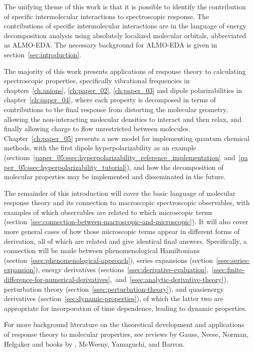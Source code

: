 \documentclass[%
class = book,%
crop = false,%
float = true,%
multi = true,%
preview = false,%
]{standalone}
\begin{document}
The unifying theme of this work is that it is possible to identify the contribution of specific intermolecular interactions to spectroscopic response. The contributions of specific intermolecular interactions are in the language of energy decomposition analysis using absolutely localized molecular orbitals, abbreviated as ALMO-EDA. The necessary background for ALMO-EDA is given in section~\ref{sec:introduction}.

The majority of this work presents applications of response theory to calculating spectroscopic properties, specifically vibrational frequencies in chapters~\ref{ch:anions}, \ref{ch:paper_02}, \ref{ch:paper_03} and dipole polarizabilities in chapter~\ref{ch:paper_04}, where each property is decomposed in terms of contributions to the final response from distorting the molecular geometry, allowing the non-interacting molecular densities to interact and then relax, and finally allowing charge to flow unrestricted between molecules. Chapter~\ref{ch:paper_05} presents a new model for implementing quantum chemical methods, with the first dipole hyperpolarizability as an example (sections~\ref{paper_05:ssec:hyperpolarizability_reference_implementation}~and~\ref{paper_05:ssec:hyperpolarizability_tutorial}), and how the decomposition of molecular properties may be implemented and disseminated in the future.

The remainder of this introduction will cover the basic language of molecular response theory and its connection to macroscopic spectroscopic observables, with examples of which observables are related to which microscopic terms (section~\ref{sec:connection-between-macroscopic-and-microscopic}). It will also cover more general cases of how those microscopic terms appear in different forms of derivation, all of which are related and give identical final answers. Specifically, a connection will be made between phenomenological Hamiltonians (section~\ref{ssec:phenomenological-approach}), series expansions (section~\ref{ssec:series-expansion}), energy derivatives (sections~\ref{ssec:derivative-evaluation},~\ref{ssec:finite-difference-for-numerical-derivatives},~and~\ref{ssec:analytic-derivative-theory}), perturbation theory (section~\ref{ssec:perturbation-theory}), and quasienergy derivatives (section~\ref{sec:dynamic-properties}), of which the latter two are appropriate for incorporation of time dependence, leading to dynamic properties.

For more background literature on the theoretical development and applications of response theory to molecular properties, see reviews by Gauss\cite{gauss2000}, Neese\cite{NEESE2009526}, Norman\cite{C1CP21951K}, Helgaker\cite{doi:10.1021/cr2002239} and books by \szabo{}\cite{szabo1989modern}, McWeeny\cite{mcweeny1989methods}, Yamaguchi\cite{Yamaguchi1994}, and Barron\cite{barron2004molecular}.
\end{document}

